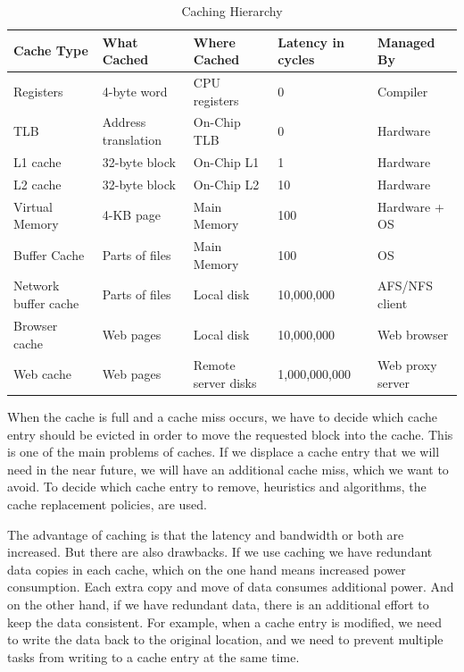 \documentclass[
	12pt,
	a4paper,
	abstract,
	bibliography=totoc,
	chapterprefix,
	headings=openright,
	numbers=endperiod,
	parskip=half,
	twoside,
]{scrreprt}
\begin{document}
\begin{table}[ht]
	\centering
	\begin{tabular}{|p{3cm}|p{3cm}|p{3cm}|p{2cm}|p{3cm}|}
		\hline
		\textbf{Cache Type} & \textbf{What Cached} & \textbf{Where Cached} & \textbf{Latency in cycles} & \textbf{Managed By}\\
		\hline
		Registers & 4-byte word & CPU registers & 0 & Compiler \\
		\hline
		TLB & Address translation & On-Chip TLB & 0 & Hardware \\
		\hline
		L1 cache & 32-byte block & On-Chip L1 & 1 & Hardware \\
		\hline
		L2 cache & 32-byte block & On-Chip L2 & 10 & Hardware \\
		\hline
		Virtual Memory & 4-KB page & Main Memory & 100 & Hardware + OS \\
		\hline
		Buffer Cache & Parts of files & Main Memory & 100 & OS \\
		\hline
		Network buffer cache & Parts of files & Local disk & 10,000,000 & AFS/NFS client \\
		\hline
		Browser cache & Web pages & Local disk & 10,000,000 & Web browser \\
		\hline
		Web cache & Web pages & Remote server disks & 1,000,000,000 & Web proxy server \\
		\hline
	\end{tabular}
	\caption{Caching Hierarchy \cite{7569243}}
	\label{tab:caching hierarchy}
\end{table}

When the cache is full and a cache miss occurs, we have to decide which cache entry should be 
evicted in order to move the requested block into the cache.
This is one of the main problems of caches. If we displace a cache entry that we will need in the near future, 
we will have an additional cache miss, which we want to avoid.
To decide which cache entry to remove, heuristics and algorithms, the cache replacement policies, are used.

The advantage of caching is that the latency and bandwidth or both are increased.
But there are also drawbacks.
If we use caching we have redundant data copies in each cache, which on the one hand means increased power consumption.
Each extra copy and move of data consumes additional power.
And on the other hand, if we have redundant data, there is an additional effort to keep the data consistent.
For example, when a cache entry is modified, we need to write the data back to the original location, and we need to prevent multiple tasks from writing to a cache entry at the same time.
\end{document}
